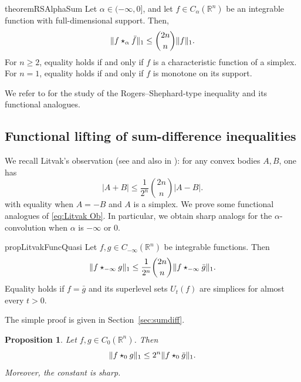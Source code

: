 \documentclass[11pt]{amsart}
\newcommand{\R}{{\mathbb R}}
\theoremstyle{plain}
\newtheorem{prop}[theorem]{Proposition}
\theoremstyle{definition}
\theoremstyle{remark}
\begin{document}
\begin{restatable}{theorem}{RSAlphaSum}\label{RS-QC-inte}
    Let $\alpha \in (-\infty,0]$, and let $ f \in C_\alpha(\R^n) $ be an integrable function with full-dimensional support. Then,
    \begin{equation} \label{RS-QC-eq-intro}
	\|f \star_{\alpha} \Bar{f}\|_1 \leq \binom{2n}{n}\|f\|_1.
    \end{equation}
    For $n\geq 2$, equality holds if and only if $f$ is a characteristic function of a simplex. For $n=1$, equality holds if and only if $f $ is monotone on its support.
\end{restatable}
We refer to \cite{A-19,AAGJV-19,AGJV-16,AHMRZ-21,C-06,FMMN-26-1,FMMN-26-2,KM-26} for the study of the Rogers--Shephard-type inequality and its functional analogues.






\subsection{Functional lifting of sum-difference inequalities}

We recall Litvak's observation (see \cite[pp. 534]{S-14} and also in \cite{FMZ-24}): for any convex bodies $A,B$, one has
\begin{equation} \label{eq:Litvak Ob}
    |A+B| \leq \frac{1}{2^n}\binom{2 n}{n} |A - B|.
\end{equation}
with equality when $A= - B$ and $A$ is a simplex. We prove some functional analogues of \eqref{eq:Litvak Ob}. In particular, we obtain sharp analogs for the $\alpha$-convolution when $\alpha$ is $-\infty$ or $0$.
\begin{restatable}{prop}{LitvakFuncQuasi}\label{p:litvak-fun}
    Let $f,g \in C_{-\infty}(\R^n)$ be integrable functions. Then
    \begin{equation}
        \| f \star_{-\infty} g\|_1 \leq \frac{1}{2^n}\binom{2 n}{n} \| f \star_{-\infty} \Bar{g}\|_1.
    \end{equation}
    Equality holds if  $f= \bar{g}$ and its superlevel sets $U_t(f)$ are simplices for almost every $t>0$.
\end{restatable}

The simple proof is given in Section~\ref{sec:sumdiff}.

\begin{prop}
    \label{prop:litvak-fun-0}
    Let $f,g \in C_{0}(\R^n)$. Then
    \begin{equation} \label{eq:Litvak-alpha-0cw}
        \| f \star_0 g\|_1 \leq 2^n\| f \star_0 \Bar{g}\|_1.
    \end{equation}
    Moreover, the constant is sharp.
\end{prop}
\end{document}
